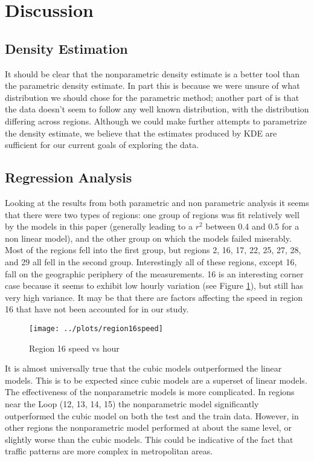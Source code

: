 \documentclass[12pt]{article}
\begin{document}
\section{Discussion}
\subsection{Density Estimation}
It should be clear that the nonparametric density estimate is a better tool than the parametric density estimate. In part this is because we were unsure of what distribution we should chose for the parametric method; another part of is that the data doesn't seem to follow any well known distribution, with the distribution differing across regions. Although we could make further attempts to parametrize the density estimate, we believe that the estimates produced by KDE are sufficient for our current goals of exploring the data.
\subsection{Regression Analysis}
Looking at the results from both parametric and non parametric analysis it seems that there were two types of regions: one group of regions was fit relatively well by the models in this paper (generally leading to a $r^2$ between 0.4 and 0.5 for a non linear model), and the other group on which the models failed miserably. Most of the regions fell into the first group, but regions 2, 16, 17, 22, 25, 27, 28, and 29 all fell in the second group. Interestingly all of these regions, except 16, fall on the geographic periphery of the measurements. 16 is an interesting corner case because it seems to exhibit low hourly variation (see Figure \ref{region16speed}), but still has very high variance. It may be that there are factors affecting the speed in region 16 that have not been accounted for in our study.
\begin{figure}[!ht]
\centering
\texttt{[image: ../plots/region16speed]}
\caption{Region 16 speed vs hour}
\label{region16speed}
\end{figure}
It is almost universally true that the cubic models outperformed the linear models. This is to be expected since cubic models are a superset of linear models. The effectiveness of the nonparametric models is more complicated. In regions near the Loop (12, 13, 14, 15) the nonparametric model significantly outperformed the cubic model on both the test and the train data. However, in other regions the nonparametric model performed at about the same level, or slightly worse than the cubic models. This could be indicative of the fact that traffic patterns are more complex in metropolitan areas.
\end{document}
